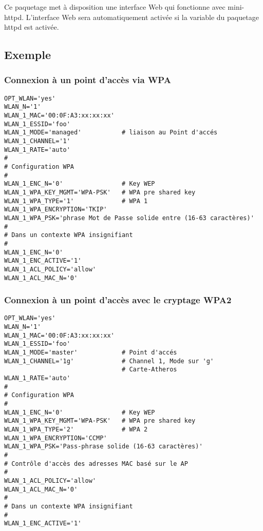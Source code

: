 	Ce paquetage met à disposition une interface Web qui fonctionne avec mini-httpd. 
    L'interface Web sera automatiquement activée si la variable 
	du paquetage httpd est activée.

\subsection{Exemple}
\subsubsection{Connexion à un point d'accès via WPA}

\begin{example}
\begin{verbatim}
OPT_WLAN='yes'
WLAN_N='1'
WLAN_1_MAC='00:0F:A3:xx:xx:xx'
WLAN_1_ESSID='foo'
WLAN_1_MODE='managed'           # liaison au Point d'accés
WLAN_1_CHANNEL='1'
WLAN_1_RATE='auto'
#
# Configuration WPA
#
WLAN_1_ENC_N='0'                # Key WEP
WLAN_1_WPA_KEY_MGMT='WPA-PSK'   # WPA pre shared key
WLAN_1_WPA_TYPE='1'             # WPA 1
WLAN_1_WPA_ENCRYPTION='TKIP'
WLAN_1_WPA_PSK='phrase Mot de Passe solide entre (16-63 caractères)'
#
# Dans un contexte WPA insignifiant
#
WLAN_1_ENC_N='0'
WLAN_1_ENC_ACTIVE='1'
WLAN_1_ACL_POLICY='allow'
WLAN_1_ACL_MAC_N='0'
\end{verbatim}
\end{example}


\subsubsection{Connexion à un point d'accès avec le cryptage WPA2}

\begin{example}
\begin{verbatim}
OPT_WLAN='yes'
WLAN_N='1'
WLAN_1_MAC='00:0F:A3:xx:xx:xx'
WLAN_1_ESSID='foo'
WLAN_1_MODE='master'            # Point d'accés
WLAN_1_CHANNEL='1g'             # Channel 1, Mode sur 'g'
                                # Carte-Atheros
WLAN_1_RATE='auto'
#
# Configuration WPA
#
WLAN_1_ENC_N='0'                # Key WEP
WLAN_1_WPA_KEY_MGMT='WPA-PSK'   # WPA pre shared key
WLAN_1_WPA_TYPE='2'             # WPA 2
WLAN_1_WPA_ENCRYPTION='CCMP'
WLAN_1_WPA_PSK='Pass-phrase solide (16-63 caractères)'
#
# Contrôle d'accès des adresses MAC basé sur le AP
#
WLAN_1_ACL_POLICY='allow'
WLAN_1_ACL_MAC_N='0'
#
# Dans un contexte WPA insignifiant
#
WLAN_1_ENC_ACTIVE='1'
\end{verbatim}
\end{example}


